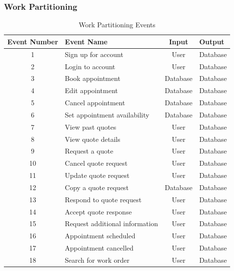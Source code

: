 \documentclass[12pt]{article}
\begin{document}
\newpage
\subsubsection{Work Partitioning}
\begin{table}[H]
	\caption{Work Partitioning Events}
	\centering
	\begin{tabular}{|c|p{3.5cm}|c|p{3.5cm}|}
		\hline
		\textbf{Event Number} & \centering\textbf{Event Name}  & \textbf{Input} & \textbf{Output} \\
		\hline
		1                     & Sign up for account            & User           & Database        \\
		\hline
		2                     & Login to account               & User           & Database        \\
		\hline
		3                     & Book appointment               & Database       & Database        \\
		\hline
		4                     & Edit appointment               & Database       & Database        \\
		\hline
		5                     & Cancel appointment             & Database       & Database        \\
		\hline
		6                     & Set appointment availability   & Database       & Database        \\
		\hline
		7                     & View past quotes               & User           & Database        \\
		\hline
		8                     & View quote details             & User           & Database        \\
		\hline
		9                     & Request a quote                & User           & Database        \\
		\hline
		10                    & Cancel quote request           & User           & Database        \\
		\hline
		11                    & Update quote request           & User           & Database        \\
		\hline
		12                    & Copy a quote request           & Database       & Database        \\
		\hline
		13                    & Respond to quote request       & User           & Database        \\
		\hline
		14                    & Accept quote response          & User           & Database        \\
		\hline
		15                    & Request additional information & User           & Database        \\
		\hline
		16                    & Appointment scheduled          & User           & Database        \\
		\hline
		17                    & Appointment cancelled          & User           & Database        \\
		\hline
		18                    & Search for work order          & User           & Database        \\
		\hline
	\end{tabular}
\end{table}
\end{document}
